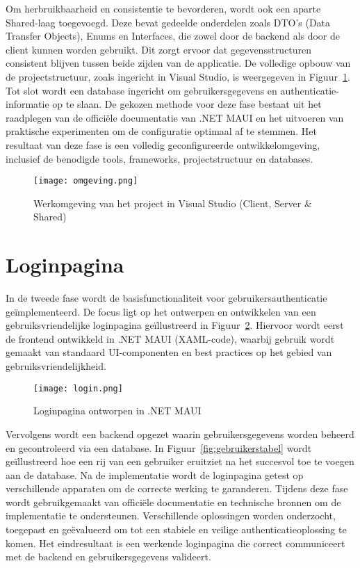Om herbruikbaarheid en consistentie te bevorderen, wordt ook een aparte Shared-laag toegevoegd. Deze bevat gedeelde onderdelen zoals DTO's (Data Transfer Objects), Enums en Interfaces, die zowel door de backend als door de client kunnen worden gebruikt. Dit zorgt ervoor dat gegevensstructuren consistent blijven tussen beide zijden van de applicatie. De volledige opbouw van de projectstructuur, zoals ingericht in Visual Studio, is weergegeven in Figuur~\ref{fig:omgeving}. \\

Tot slot wordt een database ingericht om gebruikersgegevens en authenticatie-informatie op te slaan. De gekozen methode voor deze fase bestaat uit het raadplegen van de officiële documentatie van .NET MAUI en het uitvoeren van praktische experimenten om de configuratie optimaal af te stemmen. Het resultaat van deze fase is een volledig geconfigureerde ontwikkelomgeving, inclusief de benodigde tools, frameworks, projectstructuur en databases.\\

\begin{figure}[H]
    \centering
    \texttt{[image: omgeving.png]}
    \caption{Werkomgeving van het project in Visual Studio (Client, Server & Shared)}
    \label{fig:omgeving}
\end{figure}

\section{Loginpagina}

In de tweede fase wordt de basisfunctionaliteit voor gebruikersauthenticatie geïmplementeerd. De focus ligt op het ontwerpen en ontwikkelen van een gebruiksvriendelijke loginpagina geïllustreerd in Figuur~\ref{fig:loginpagina}. Hiervoor wordt eerst de frontend ontwikkeld in .NET MAUI (XAML-code), waarbij gebruik wordt gemaakt van standaard UI-componenten en best practices op het gebied van gebruiksvriendelijkheid. \\

\begin{figure}[H]
    \centering
    \texttt{[image: login.png]}
    \caption{Loginpagina ontworpen in .NET MAUI}
    \label{fig:loginpagina}
\end{figure}

Vervolgens wordt een backend opgezet waarin gebruikersgegevens worden beheerd en gecontroleerd via een database. In Figuur~\ref{fig:gebruikerstabel} wordt geïllustreerd hoe een rij van een gebruiker eruitziet na het succesvol toe te voegen aan de database. Na de implementatie wordt de loginpagina getest op verschillende apparaten om de correcte werking te garanderen. Tijdens deze fase wordt gebruikgemaakt van officiële documentatie en technische bronnen om de implementatie te ondersteunen. Verschillende oplossingen worden onderzocht, toegepast en geëvalueerd om tot een stabiele en veilige authenticatieoplossing te komen. Het eindresultaat is een werkende loginpagina die correct communiceert met de backend en gebruikersgegevens valideert.

